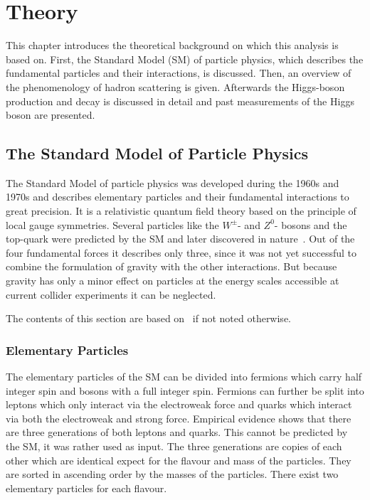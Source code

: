 \chapter{Theory}\label{cha:theory}

This chapter introduces the theoretical background on which this analysis is based on.
First, the Standard Model (SM) of particle physics, which describes the fundamental particles and their interactions, is discussed.
Then, an overview of the phenomenology of hadron scattering is given.
Afterwards the Higgs-boson production and decay is discussed in detail and past measurements of the Higgs boson are presented.

\section{The Standard Model of Particle Physics}\label{sec:theory:sm}

The Standard Model of particle physics was developed during the 1960s and 1970s and
describes elementary particles and their fundamental interactions to great precision.
It is a relativistic quantum field theory based on the principle of local gauge symmetries.
Several particles like the $W^\pm$- and $Z^0$- bosons and the top-quark were predicted by the SM and later discovered in
nature~\cite{ZDiscovery,WDiscovery,TopDiscovery,ZeeDiscovery,WeDiscovery,TopDiscoveryD0}.
Out of the four fundamental forces it describes only three, since it was not yet successful to combine the
formulation of gravity with the other interactions.
But because gravity has only a minor effect on particles at the energy scales accessible at current collider experiments
it can be neglected.

The contents of this section are based on~\cite{Griffiths,HalsenMartin,PeskinSchroeder} if not noted otherwise.

\subsection{Elementary Particles}\label{sub:theory:sm:particles}

The elementary particles of the SM can be divided into fermions which carry half integer spin and bosons with a full integer spin.
Fermions can further be split into leptons which only interact via the electroweak force and quarks which interact via
both the electroweak and strong force.
Empirical evidence shows that there are three generations of both leptons and quarks.
This cannot be predicted by the SM, it was rather used as input.
The three generations are copies of each other which are identical expect for the flavour and mass of the particles.
They are sorted in ascending order by the masses of the particles.
There exist two elementary particles for each flavour.

